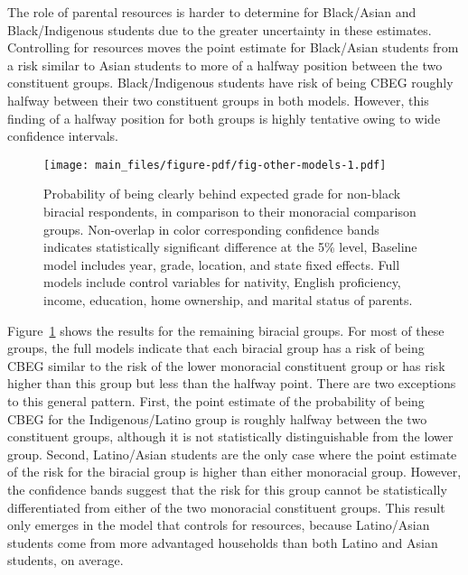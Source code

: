 \documentclass[
  letterpaper,
  DIV=11,
  numbers=noendperiod]{scrartcl}
\begin{document}
The role of parental resources is harder to determine for Black/Asian
and Black/Indigenous students due to the greater uncertainty in these
estimates. Controlling for resources moves the point estimate for
Black/Asian students from a risk similar to Asian students to more of a
halfway position between the two constituent groups. Black/Indigenous
students have risk of being CBEG roughly halfway between their two
constituent groups in both models. However, this finding of a halfway
position for both groups is highly tentative owing to wide confidence
intervals.

\begin{figure}[p]

{\centering \texttt{[image: main\_files/figure-pdf/fig-other-models-1.pdf]}

}

\caption{\label{fig-other-models}Probability of being clearly behind
expected grade for non-black biracial respondents, in comparison to
their monoracial comparison groups. Non-overlap in color corresponding
confidence bands indicates statistically significant difference at the
5\% level, Baseline model includes year, grade, location, and state
fixed effects. Full models include control variables for nativity,
English proficiency, income, education, home ownership, and marital
status of parents.}

\end{figure}

Figure~\ref{fig-other-models} shows the results for the remaining
biracial groups. For most of these groups, the full models indicate that
each biracial group has a risk of being CBEG similar to the risk of the
lower monoracial constituent group or has risk higher than this group
but less than the halfway point. There are two exceptions to this
general pattern. First, the point estimate of the probability of being
CBEG for the Indigenous/Latino group is roughly halfway between the two
constituent groups, although it is not statistically distinguishable
from the lower group. Second, Latino/Asian students are the only case
where the point estimate of the risk for the biracial group is higher
than either monoracial group. However, the confidence bands suggest that
the risk for this group cannot be statistically differentiated from
either of the two monoracial constituent groups. This result only
emerges in the model that controls for resources, because Latino/Asian
students come from more advantaged households than both Latino and Asian
students, on average.
\end{document}
